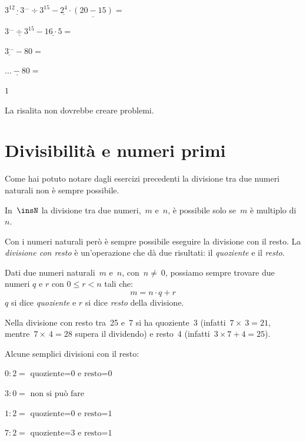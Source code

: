 \begin{exrig}
\begin{esempio}
 \(\underline{3^{12} \cdot 3^{\dots}} \div 3^{15} -
  \underline{2^{4}} \cdot \underline{\left( 20 - 15 \right)} =\)

  \(\underline{3^{\dots} \div 3^{15}} -
  \underline{16 \cdot 5} =\)

  \(\underline{3^{\dots}} - 80 =\)

  \(\underline{{\dots} - 80} =\)
  
  \(1\)

  La risalita non dovrebbe creare problemi.
  
 \end{esempio}
\end{exrig}

\section{Divisibilità e numeri primi}
\label{sec:01_divsibilita}

Come hai potuto notare dagli esercizi precedenti la divisione tra due 
numeri naturali non è sempre possibile.

\osservazione In~\(\insN\) la divisione tra due numeri,~\(m\) e~\(n\), è 
possibile solo se~\(m\) è multiplo di~\(n\).

Con i numeri naturali però è sempre possibile eseguire la divisione con il 
resto. La \emph{divisione con resto} è un'operazione che dà due risultati:
il \emph{quoziente} e il \emph{resto}.

\begin{definizione}
 Dati due numeri naturali~\(m\) e~\(n\), con~\(n\neq~0\), 
 possiamo sempre trovare due numeri \(q\) e \(r\) con \(0 \leqslant r < n\) 
 tali che: 
 \[m = n \cdot q + r\] 
 \(q\) si dice \emph{quoziente} e \(r\) si dice \emph{resto} della divisione.
\end{definizione}

\begin{exrig}
 \begin{esempio}
 Nella divisione con resto tra~25 e~7 si ha quoziente~3 
 (infatti~\(7\times~3=21\),
 mentre~\(7\times~4=28\) supera il dividendo) e resto~4 
 (infatti~\(3 \times 7 + 4 = 25\)).

\begin{inaccessibleblock}
 
\end{inaccessibleblock}
 \end{esempio}

 \begin{esempio}
 Alcune semplici divisioni con il resto:
 
\begin{multicols}{2}
\(0:2 = \text{ quoziente=0 e resto=0}\)

\(3:0 = \text{ non si può fare}\)

\(1:2 = \text{ quoziente=0 e resto=1}\)

\(7:2 = \text{ quoziente=3 e resto=1}\)
\end{multicols}

 \end{esempio}
\end{exrig}

